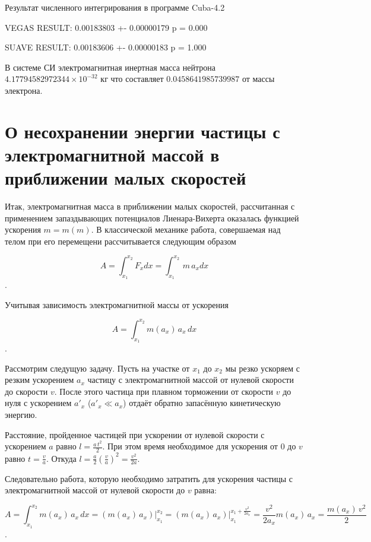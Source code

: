 \documentclass{article}
\begin{document}
Результат численного интегрирования в программе Cuba-4.2

VEGAS RESULT:   0.00183803 +- 0.00000179        p = 0.000

SUAVE RESULT:   0.00183606 +- 0.00000183        p = 1.000

В системе СИ  электромагнитная инертная масса нейтрона $4.17794582972344 \times 10^{-32}$ кг что составляет $0.0458641985739987$ от массы электрона.




\section{О несохранении энергии частицы с электромагнитной массой в приближении малых скоростей}

Итак, электромагнитная масса в приближении малых скоростей, рассчитанная с применением запаздывающих потенциалов Лиенара-Вихерта оказалась функцией ускорения $m = m\left(m\right)$. В классической механике работа, совершаемая над телом при его перемещени рассчитывается следующим образом

\[A = \int_{x_1}^{x_2}F_x dx = \int_{x_1}^{x_2}\,m \, a_x dx\].

Учитывая зависимость электромагнитной массы от ускорения

\[A = \int_{x_1}^{x_2} m(a_x) \, a_x \, dx\].

Рассмотрим следущую задачу. Пусть на участке от $x_1$ до $x_2$ мы резко ускоряем с резким ускорением $a_x$ частицу с электромагнитной массой от нулевой скорости до скорости $v$. После этого частица при плавном торможении от скорости $v$ до нуля с ускорением $a'_x$ ($a'_x\ll a_x$) отдаёт обратно запасённую кинетическую энергию.

Расстояние, пройденное частицей при ускорении от нулевой скорости с ускорением $a$ равно $l = \frac{a\, t^2}{2}$. При этом время необходимое для ускорения от $0$ до $v$ равно $t = \frac{v}{a}$. Откуда $l = \frac{a}{2} \left(\frac{v}{a}\right)^2 = \frac{v^2}{2a}$.

Следовательно работа, которую необходимо затратить для ускорения частицы с электромагнитной массой от нулевой скорости до $v$ равна:

\[A = \int_{x_1}^{x_2} m(a_x) \, a_x \, dx = \left(m(a_x) \, a_x\right)\Bigg|_{x_1}^{x_2} = \left(m(a_x) \, a_x\right)\Bigg|_{x_1}^{x_1 + \frac{v^2}{2a_x}} = \frac{v^2}{2a_x} m(a_x) \, a_x = \frac{m(a_x) \, v^2}{2}\].
\end{document}

